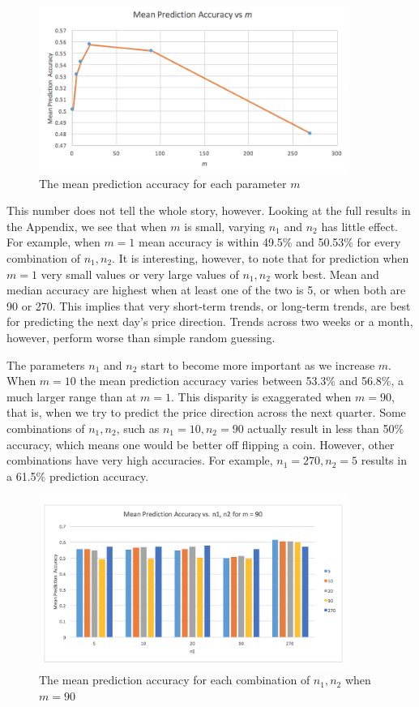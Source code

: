\documentclass[pageno]{jpaper}
\begin{document}
\begin{figure}
\includegraphics[width=0.9\textwidth]{MeanReturnvsM.png}
\caption{The mean prediction accuracy for each parameter $m$}
\label{fig: meanvsm}
\end{figure}


This number does not tell the whole story, however. Looking at the full results in the Appendix, we see that when $m$ is small, varying $n_1$ and $n_2$ has little effect. For example, when $m=1$ mean accuracy is within 49.5\% and 50.53\% for every combination of $n_1, n_2$. It is interesting, however, to note that for prediction when $m=1$ very small values or very large values of $n_1, n_2$ work best. Mean and median accuracy are highest when at least one of the two is 5, or when both are 90 or 270. This implies that very short-term trends, or long-term trends, are best for predicting the next day's price direction. Trends across two weeks or a month, however, perform worse than simple random guessing.

The parameters $n_1$ and $n_2$ start to become more important as we increase $m$. When $m=10$ the mean prediction accuracy varies between 53.3\% and 56.8\%, a much larger range than at $m=1$. This disparity is exaggerated when $m=90$, that is, when we try to predict the price direction across the next quarter. Some combinations of $n_1, n_2$, such as $n_1=10, n_2=90$ actually result in less than 50\% accuracy, which means one would be better off flipping a coin. However, other combinations have very high accuracies. For example, $n_1 = 270, n_2 = 5$ results in a 61.5\% prediction accuracy. 

\begin{figure}
\includegraphics[width=0.9\textwidth]{MeanAccuraciesForQuarter.png}
\caption{The mean prediction accuracy for each combination of $n_1, n_2$ when $m=90$}
\label{fig: meansforquarter}
\end{figure}
\end{document}
